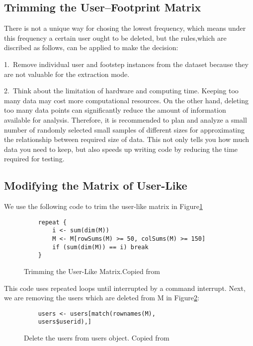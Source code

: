 \subsection{Trimming the User–Footprint Matrix~\cite{hid515-12}}

There is not a unique way for chosing the lowest 
frequency, which means under this frequency a certain user ought to be 
deleted, but the rules,which are discribed as follows, 
can be applied to make the decision:

1.\ Remove individual user and footstep instances from the 
dataset because they are not valuable for the extraction mode. 

2.\ Think about the limitation of hardware and computing time. 
Keeping too many data may cost more computational resources. 
On the
 other hand, deleting too many data points can significantly reduce
 the amount of information available for analysis. Therefore, it is
 recommended to plan and analyze a small number of randomly 
selected small samples of different sizes for approximating 
the relationship between required size of data. 
This not only tells you how much data you need to keep, 
but also speeds up writing code by reducing the time required for 
testing.

\subsection{Modifying the Matrix of User-Like~\cite{hid515-12}}

We use the following code to trim the user-like 
matrix in Figure\ref{F:Trimming}

\begin{figure}[htb]
\begin{footnotesize}
\begin{verbatim}
    repeat {
        i <- sum(dim(M))
        M <- M[rowSums(M) >= 50, colSums(M) >= 150]
        if (sum(dim(M)) == i) break
    }
\end{verbatim}
\end{footnotesize}
\caption{Trimming the User-Like Matrix.Copied from~\cite{hid515-12}}
\label{F:Trimming}
\end{figure}


This code uses repeated loops until interrupted by a command 
interrupt. 
Next, we are removing the users which are deleted from M in 
Figure\ref{F:delete}:

\begin{figure}[htb]
\begin{footnotesize}
\begin{verbatim}
    users <- users[match(rownames(M),
    users$userid),]
\end{verbatim}
\end{footnotesize}
\caption{Delete the users from users object. 
Copied from~\cite{hid515-12}}
\label{F:delete}
\end{figure}


